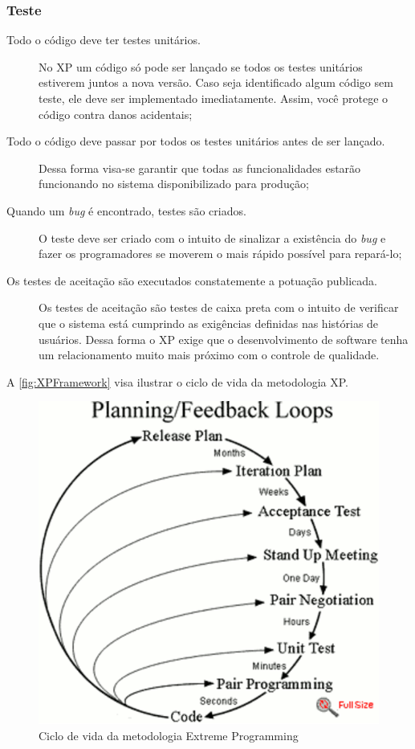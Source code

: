 \subsubsection{Teste}
\begin{description}
    \item[Todo o código deve ter testes unitários.] No \gls{XP} um código só pode ser
    lançado se todos os testes unitários estiverem juntos a nova versão. Caso seja
    identificado algum código sem teste, ele deve ser implementado imediatamente. Assim,
    você protege o código contra danos acidentais;
    \item[Todo o código deve passar por todos os testes unitários antes de ser lançado.]
    Dessa forma visa-se garantir que todas as funcionalidades estarão funcionando no
    sistema disponibilizado para produção;
    \item[Quando um \textit{bug} é encontrado, testes são criados.] O teste deve ser
    criado com o intuito de sinalizar a existência do \textit{bug} e fazer os
    programadores se moverem o mais rápido possível para repará-lo;
    \item[Os testes de aceitação são executados constatemente a potuação publicada.]
    Os testes de aceitação são testes de caixa preta com o intuito de verificar que
    o sistema está cumprindo as exigências definidas nas histórias de usuários. Dessa
    forma o \gls{XP} exige que o desenvolvimento de software tenha um relacionamento
    muito mais próximo com o controle de qualidade.
\end{description}

A \autoref{fig:XPFramework} visa ilustrar o ciclo de vida da metodologia \acrlong{XP}.

    \begin{figure}[h]
      \centering
      \includegraphics[keepaspectratio=true,scale=0.8]{figuras/xpFramework.eps}
      \caption{Ciclo de vida da metodologia  Extreme Programming\label{fig:XPFramework}}
    \end{figure}

